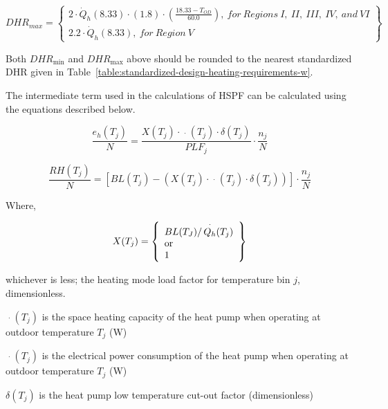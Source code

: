 \begin{equation}
  DHR_{max} =
  \left\{
    \begin{array}{l}
      {2 \cdot \dot{Q}_h}(8.33) \cdot (1.8) \cdot \left( {\frac{{18.33 - {T_{OD}}}}{{60.0}}} \right), {~for~Regions~I,~II,~III,~IV,~and~VI} \\
      {2.2 \cdot \dot{Q}_h}(8.33),{~for~Region~V}
    \end{array}
  \right\}
\end{equation}

Both \(DH{R_{\min }}\) and \(DH{R_{\max }}\) above should be rounded to the nearest standardized DHR given in Table~\ref{table:standardized-design-heating-requirements-w}.

The intermediate term used in the calculations of HSPF can be calculated using the equations described below.

\begin{equation}
\frac{{{e_h}({T_j})}}{N} = \frac{{X({T_j}) \cdot \mathop {{E_h}}\limits^ \cdot  ({T_j}) \cdot \delta ({T_j})}}{{PL{F_j}}} \cdot \frac{{{n_j}}}{N}
\end{equation}

\begin{equation}
\frac{{RH({T_j})}}{N} = \left[ {BL({T_j}) - \left( {X({T_j}) \cdot \mathop {{Q_h}}\limits^ \cdot  ({T_j}) \cdot \delta ({T_j})} \right)} \right] \cdot \frac{{{n_j}}}{N}
\end{equation}

Where,

\begin{equation}
X({T_j}) = \left\{
    \begin{array}{l}
      BL({T_J})/\mathop {{Q_h}}\limits^ \cdot  ({T_j}) \\
      {\rm{or}} \\
      1
    \end{array}
  \right\}
\end{equation}

whichever is less; the heating mode load factor for temperature bin \(j\), dimensionless.

\(\mathop {{Q_h}}\limits^ \cdot ({T_j})\) is the space heating capacity of the heat pump when operating at outdoor temperature \({T_j}\) (W)

\(\mathop {{E_h}}\limits^ \cdot ({T_j})\) is the electrical power consumption of the heat pump when operating at outdoor temperature \({T_j}\) (W)

\(\delta ({T_j})\) is the heat pump low temperature cut-out factor (dimensionless)

